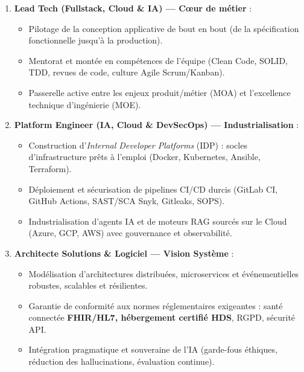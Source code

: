\documentclass[10pt,a4paper]{article}
\begin{document}
\begin{enumerate}[leftmargin=1.4em, itemsep=0.35em, topsep=0.2em]
    \item \textbf{\color{brandTeal}Lead Tech (Fullstack, Cloud \& IA) --- Cœur de métier} :
    \begin{itemize}[leftmargin=1.2em, itemsep=0.1em]
        \item Pilotage de la conception applicative de bout en bout (de la spécification fonctionnelle jusqu'à la production).
        \item Mentorat et montée en compétences de l'équipe (Clean Code, SOLID, TDD, revues de code, culture Agile Scrum/Kanban).
        \item Passerelle active entre les enjeux produit/métier (MOA) et l'excellence technique d'ingénierie (MOE).
    \end{itemize}

    \item \textbf{\color{brandTeal}Platform Engineer (IA, Cloud \& DevSecOps) --- Industrialisation} :
    \begin{itemize}[leftmargin=1.2em, itemsep=0.1em]
        \item Construction d'\emph{Internal Developer Platforms} (IDP) : socles d'infrastructure prêts à l'emploi (Docker, Kubernetes, Ansible, Terraform).
        \item Déploiement et sécurisation de pipelines CI/CD durcis (GitLab CI, GitHub Actions, SAST/SCA Snyk, Gitleaks, SOPS).
        \item Industrialisation d'agents IA et de moteurs RAG sourcés sur le Cloud (Azure, GCP, AWS) avec gouvernance et observabilité.
    \end{itemize}

    \item \textbf{\color{brandTeal}Architecte Solutions \& Logiciel --- Vision Système} :
    \begin{itemize}[leftmargin=1.2em, itemsep=0.1em]
        \item Modélisation d'architectures distribuées, microservices et événementielles robustes, scalables et résilientes.
        \item Garantie de conformité aux normes réglementaires exigeantes : santé connectée \textbf{FHIR/HL7, hébergement certifié HDS}, RGPD, sécurité API.
        \item Intégration pragmatique et souveraine de l'IA (garde-fous éthiques, réduction des hallucinations, évaluation continue).
    \end{itemize}
\end{enumerate}
\end{document}
